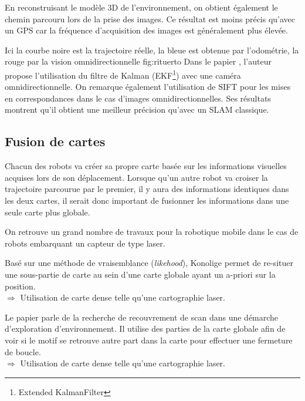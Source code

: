 En reconstruisant le modèle 3D de l’environnement, on obtient également le chemin parcouru lors de la prise des images.
Ce résultat est moins précis qu'avec un GPS car la fréquence d'acquisition des images est généralement plus élevée.

 {Ici la courbe noire est la trajectoire réelle, la bleue est obtenue par l'odométrie, la rouge par la vision omnidirectionnelle} {fig:rituerto}
Dans le papier \cite{Rituerto10}, l'auteur propose l'utilisation du filtre de Kalman (EKF\footnote{Extended KalmanFilter}) avec une caméra omnidirectionnelle. On remarque également l'utilisation de SIFT pour les mises en correspondances dans le cas d'images omnidirectionnelles. Ses résultats montrent qu'il obtient une meilleur précision qu'avec un SLAM classique. 


\subsection{Fusion de cartes}

Chacun des robots va créer sa propre carte basée sur les informations visuelles acquises lors de son déplacement.
Lorsque qu'un autre robot va croiser la trajectoire parcourue par le premier, il y aura des informations identiques dans les deux cartes, il serait donc important de fusionner les informations dans une seule carte plus globale.

On retrouve un grand nombre de travaux pour la robotique mobile dans le cas de robots embarquant un capteur de type laser.

Basé sur une méthode de vraisemblance (\textit{likehood}), Konolige \cite{Konolige03} permet de re-situer une sous-partie de carte au sein d'une carte globale ayant un a-priori sur la position.\\
$\Rightarrow$ Utilisation de carte dense telle qu'une cartographie laser.


Le papier \cite{Gutmann99} parle de la recherche de recouvrement de scan dans une démarche d'exploration d'environnement. 
Il utilise des parties de la carte globale afin de voir si le motif se retrouve autre part dans la carte pour effectuer une fermeture de boucle.\\
$\Rightarrow$ Utilisation de carte dense telle qu'une cartographie laser.


